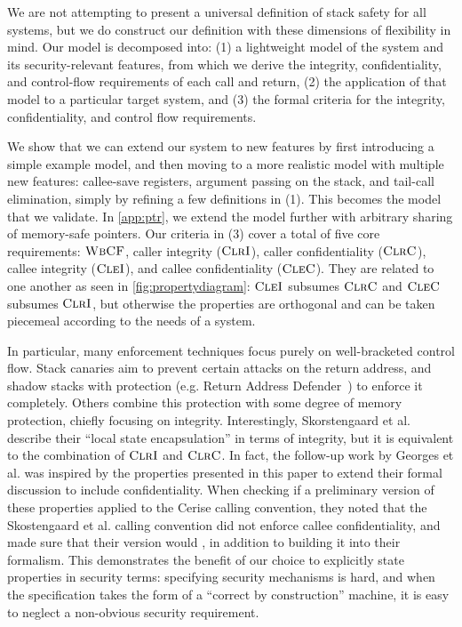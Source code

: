 \documentclass[10pt,conference]{ieeetran}%
\theoremstyle{definition}
\begin{document}
We are not attempting to present a universal definition of stack safety for all systems,
but we do construct our definition with these dimensions of flexibility in mind.
Our model is decomposed into:
(1) a lightweight model of the system and its security-relevant features, from which we
derive the integrity, confidentiality, and control-flow requirements of each call and
return, (2) the application of that model to a particular target system, and (3)
the formal criteria for the integrity, confidentiality, and control flow
requirements.

We show that we can extend our system to new features by first introducing a simple
example model, and then moving to a more realistic model with multiple new features:
callee-save registers, argument passing on the stack, and tail-call elimination, simply
by refining a few definitions in (1). This becomes the model that we validate.
In \cref{app:ptr}, we extend the model further with arbitrary sharing of memory-safe
pointers. Our criteria in (3) cover a total of five core requirements:
\(\textnormal{\sc WbCF}\), caller integrity (\(\textnormal{\sc ClrI}\)), caller confidentiality (\(\textnormal{\sc ClrC}\)),
callee integrity (\(\textnormal{\sc CleI}\)), and callee confidentiality (\(\textnormal{\sc CleC}\)).
They are related to one another as seen in
\cref{fig:propertydiagram}: \(\textnormal{\sc CleI}\) subsumes \(\textnormal{\sc ClrC}\) and \(\textnormal{\sc CleC}\) subsumes
\(\textnormal{\sc ClrI}\), but otherwise the properties are orthogonal and can be taken piecemeal
according to the needs of a system.

In particular, many enforcement techniques focus purely on
well-bracketed control flow. Stack canaries aim to prevent certain attacks on the return
address, and shadow stacks with protection (e.g. Return Address Defender~\cite{Chiueh2001RAD})
to enforce it completely. Others combine this protection with some degree of memory protection,
chiefly focusing on integrity. Interestingly, Skorstengaard et al.~\cite{SkorstengaardSTKJFP}
describe their ``local state encapsulation'' in terms of integrity, but it is equivalent
to the combination of \(\textnormal{\sc ClrI}\) and \(\textnormal{\sc ClrC}\). In fact, the follow-up work by
Georges et al. \cite{Georges22:TempsDesCerises} was inspired by the properties presented in this paper to extend their formal discussion to include confidentiality.
When checking if a preliminary version of these properties applied to
the Cerise calling convention, they noted that the Skostengaard et al. calling convention
did not enforce callee confidentiality, and made sure that their version would
\cite{Georges22:personalcommunication}, in addition to building it into their formalism.
This demonstrates the benefit of our choice to explicitly state properties in security
terms: specifying security mechanisms is hard, and when the specification takes the
form of a ``correct by construction'' machine, it is easy to neglect a non-obvious
security requirement.
\end{document}
